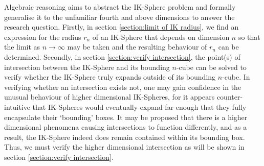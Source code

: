 \noindent Algebraic reasoning aims to abstract the IK-Sphere problem and formally generalise it to the unfamiliar fourth and above dimensions to answer the research question. Firstly, in section \ref{section:limit of IK radius}, we find an expression for the radius $r_n$ of an IK-Sphere that depends on dimension $n$ so that the limit as $n \to \infty$ may be taken and the resulting behaviour of $r_n$ can be determined. Secondly, in section \ref{section:verify intersection}, the point(s) of intersection between the IK-Sphere and its bounding $n$-cube can be solved to verify whether the IK-Sphere truly expands outside of its bounding $n$-cube. In verifying whether an intersection exists not, one may gain confidence in the unusual behaviour of higher dimensional IK-Spheres, for it appears counter-intuitive that IK-Spheres would eventually expand far enough that they fully encapsulate their `bounding' boxes. It may be proposed that there is a higher dimensional phenomena causing intersections to function differently, and as a result, the IK-Sphere indeed does remain contained within its bounding box. Thus, we must verify the higher dimensional intersection as will be shown in section \ref{section:verify intersection}.
 
